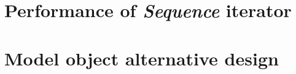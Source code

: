 
\section{Performance of \emph{Sequence} iterator}
\label{Sec:MO-perf-iter}



\section{Model object alternative design}
\label{Sec:MO-alt-design}

